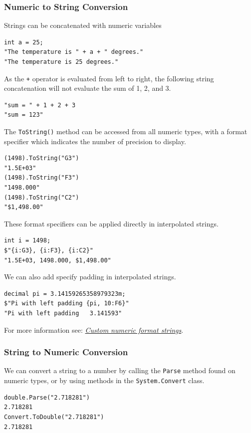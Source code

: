 \documentclass{article}
\def\customlinemarker#1#2{
    \edef\thelstnumber{%
        \unexpanded{%
            \ifnum#1=\value{lstnumber}\relax
              #2%
            \fi}%
        \ifx\thelstnumber\relax\else
        \expandafter\unexpanded\expandafter{\thelstnumber}%
        \fi
    }
}
\begin{document}
\subsubsection{Numeric to String Conversion}
Strings can be concatenated with numeric variables
\begingroup
\let\thelstnumber\relax
\customlinemarker{1}{\$}
\customlinemarker{2}{\$}
\begin{lstlisting}
int a = 25;
"The temperature is " + a + " degrees."
"The temperature is 25 degrees."
\end{lstlisting}
\endgroup
As the \lstinline{+} operator is evaluated from left to right, the following string concatenation
will not evaluate the sum of 1, 2, and 3.
\begingroup
\let\thelstnumber\relax
\customlinemarker{1}{\$}
\begin{lstlisting}
"sum = " + 1 + 2 + 3
"sum = 123"
\end{lstlisting}
\endgroup
The \lstinline{ToString()} method can be accessed from all numeric types, with a
format specifier which indicates the number of precision to display.
\begingroup
\let\thelstnumber\relax
\customlinemarker{1}{\$}
\customlinemarker{3}{\$}
\customlinemarker{5}{\$}
\begin{lstlisting}
(1498).ToString("G3")
"1.5E+03"
(1498).ToString("F3")
"1498.000"
(1498).ToString("C2")
"$1,498.00"
\end{lstlisting}
\endgroup
These format specifiers can be applied directly in interpolated strings.
\begingroup
\let\thelstnumber\relax
\customlinemarker{1}{\$}
\customlinemarker{2}{\$}
\begin{lstlisting}
int i = 1498;
$"{i:G3}, {i:F3}, {i:C2}"
"1.5E+03, 1498.000, $1,498.00"
\end{lstlisting}
\endgroup
We can also add specify padding in interpolated strings.
\begingroup
\let\thelstnumber\relax
\customlinemarker{1}{\$}
\customlinemarker{2}{\$}
\begin{lstlisting}
decimal pi = 3.14159265358979323m;
$"Pi with left padding {pi, 10:F6}"
"Pi with left padding   3.141593"
\end{lstlisting}
\endgroup
For more information see: \href{https://docs.microsoft.com/en-us/dotnet/standard/base-types/custom-numeric-format-strings}{\textit{Custom numeric format strings}}.
\subsubsection{String to Numeric Conversion}
We can convert a string to a number by calling the \lstinline{Parse} method found on numeric types,
or by using methods in the \lstinline{System.Convert} class.
\begingroup
\let\thelstnumber\relax
\customlinemarker{1}{\$}
\customlinemarker{3}{\$}
\begin{lstlisting}
double.Parse("2.718281")
2.718281
Convert.ToDouble("2.718281")
2.718281
\end{lstlisting}
\endgroup
\end{document}
